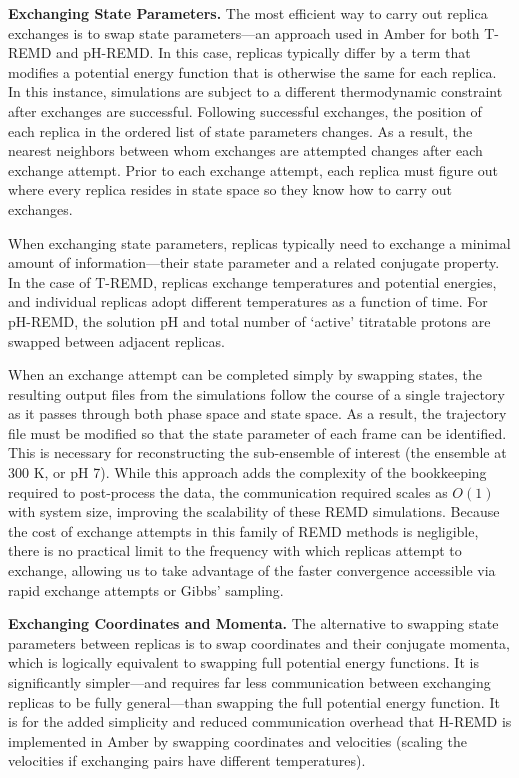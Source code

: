 \textbf{Exchanging State Parameters.} The most efficient way to carry out
replica exchanges is to swap state parameters---an approach used in Amber for
both T-REMD and pH-REMD. In this case, replicas typically differ by a term that
modifies a potential energy function that is otherwise the same for each
replica. In this instance, simulations are subject to a different thermodynamic
constraint after exchanges are successful. Following successful exchanges, the
position of each replica in the ordered list of state parameters changes. As a
result, the nearest neighbors between whom exchanges are attempted changes after
each exchange attempt.  Prior to each exchange attempt, each replica must figure
out where every replica resides in state space so they know how to carry out
exchanges.

When exchanging state parameters, replicas typically need to exchange a minimal
amount of information---their state parameter and a related conjugate property.
In the case of T-REMD, replicas exchange temperatures and potential energies,
and individual replicas adopt different temperatures as a function of time. For
pH-REMD, the solution pH and total number of `active' titratable protons are
swapped between adjacent replicas.

When an exchange attempt can be completed simply by swapping states, the
resulting output files from the simulations follow the course of a single
trajectory as it passes through both phase space and state space. As a result,
the trajectory file must be modified so that the state parameter of each frame
can be identified. This is necessary for reconstructing the sub-ensemble of
interest (\eg the ensemble at 300 K, or pH 7). While this approach adds the
complexity of the bookkeeping required to post-process the data, the
communication required scales as $O(1)$ with system size, improving the
scalability of these REMD simulations.
\cite{Swails_JChemTheoryComput_2012_v8_p4393} Because the cost of exchange
attempts in this family of REMD methods is negligible, there is no practical
limit to the frequency with which replicas attempt to exchange, allowing us to
take advantage of the faster convergence accessible via rapid exchange attempts
\cite{Sindhikara2008, Sindhikara2010} or Gibbs' sampling.
\cite{Chodera_JChemPhys_2011_v135_p194110}

\textbf{Exchanging Coordinates and Momenta.} The alternative to swapping state
parameters between replicas is to swap coordinates and their conjugate momenta,
which is logically equivalent to swapping full potential energy functions. It is
significantly simpler---and requires far less communication between exchanging
replicas to be fully general---than swapping the full potential energy function.
It is for the added simplicity and reduced communication overhead that H-REMD is
implemented in Amber by swapping coordinates and velocities (scaling the
velocities if exchanging pairs have different temperatures).
\cite{Meng_JChemTheoryComput_2011_v7_p2721}

